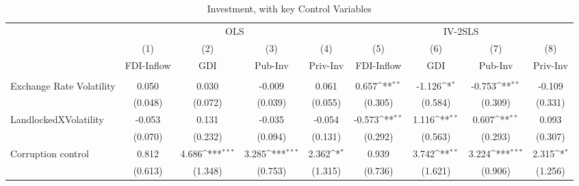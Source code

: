 \begin{table}[H] \def\sym#1{\ifmmode^{#1}\else\(^{#1}\)\fi} \caption{Investment, with key Control Variables} \begin{adjustbox}{max width=\textwidth} \begin{tabular}{l*{8}{c}} \\ \hline\hline
            &\multicolumn{4}{c}{OLS}                                                                &\multicolumn{4}{c}{IV-2SLS}                                                            \\\cmidrule(lr){2-5}\cmidrule(lr){6-9}
            &\multicolumn{1}{c}{(1)}&\multicolumn{1}{c}{(2)}&\multicolumn{1}{c}{(3)}&\multicolumn{1}{c}{(4)}&\multicolumn{1}{c}{(5)}&\multicolumn{1}{c}{(6)}&\multicolumn{1}{c}{(7)}&\multicolumn{1}{c}{(8)}\\
            &\multicolumn{1}{c}{FDI-Inflow}&\multicolumn{1}{c}{GDI}&\multicolumn{1}{c}{Pub-Inv}&\multicolumn{1}{c}{Priv-Inv}&\multicolumn{1}{c}{FDI-Inflow}&\multicolumn{1}{c}{GDI}&\multicolumn{1}{c}{Pub-Inv}&\multicolumn{1}{c}{Priv-Inv}\\
\hline \addlinespace \multicolumn{8}{l}{} \\  \addlinespace[2pt]
Exchange Rate Volatility&       0.050         &       0.030         &      -0.009         &       0.061         &       0.657\sym{**} &      -1.126\sym{*}  &      -0.753\sym{**} &      -0.109         \\
            &     (0.048)         &     (0.072)         &     (0.039)         &     (0.055)         &     (0.305)         &     (0.584)         &     (0.309)         &     (0.331)         \\
\addlinespace
LandlockedXVolatility&      -0.053         &       0.131         &      -0.035         &      -0.054         &      -0.573\sym{**} &       1.116\sym{**} &       0.607\sym{**} &       0.093         \\
            &     (0.070)         &     (0.232)         &     (0.094)         &     (0.131)         &     (0.292)         &     (0.563)         &     (0.293)         &     (0.307)         \\
\addlinespace
Corruption control&       0.812         &       4.686\sym{***}&       3.285\sym{***}&       2.362\sym{*}  &       0.939         &       3.742\sym{**} &       3.224\sym{***}&       2.315\sym{*}  \\
            &     (0.613)         &     (1.348)         &     (0.753)         &     (1.315)         &     (0.736)         &     (1.621)         &     (0.906)         &     (1.256)         \\

\end{tabular}
\end{adjustbox}
\end{table}
